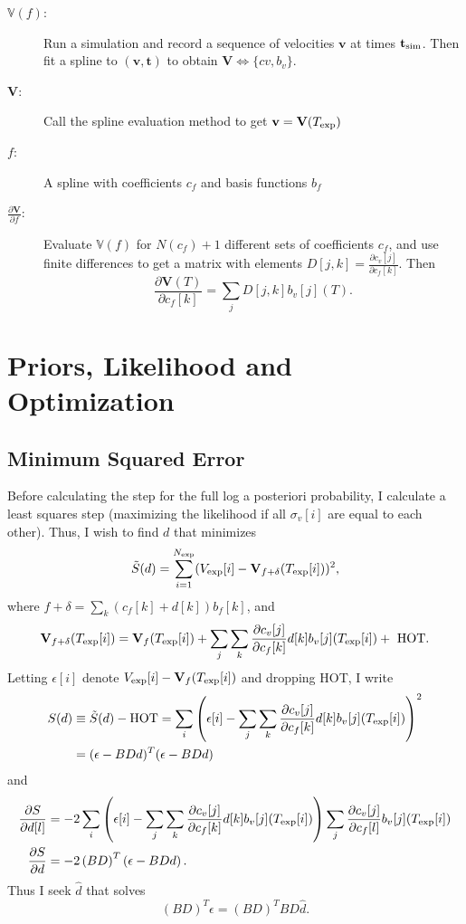 \documentclass[12pt]{article}
\newcommand{\partiald}[2]{\frac{\partial #1}{\partial #2}}
\newcommand\bv{\mathbf{v}}
\newcommand\bt{\mathbf{t}}
\newcommand\Vfunc{\mathbb{V}}
\newcommand\Vt{\mathbf{V}}
\newcommand\vexp{V_{\rm{exp}}}
\newcommand\texp{T_{\rm{exp}}}
\newcommand\cf{c_f}
\newcommand\cv{c_v}
\newcommand\fbasis{b_f}
\newcommand\vbasis{b_v}
\newcommand\tsim{{\mathbf t}_{\rm{sim}}}
\newcommand\DVDf{\partiald{\Vt}{f}}
\begin{document}
\begin{description}
\item[$\Vfunc(f)$:] Run a simulation and record a sequence of
  velocities $\bv$ at times $\tsim$.  Then fit a
  spline to $(\bv, \bt)$ to obtain $\Vt\iff \{cv,\vbasis\}$.
\item[$\Vt$:] Call the spline evaluation method to get $\bv = \Vt(\texp)$
\item[$f$:] A spline with coefficients $\cf$ and basis functions
  $\fbasis$
\item[$\DVDf$:] Evaluate $\Vfunc(f)$ for $N(\cf)+1$ different sets of
  coefficients $\cf$, and use finite differences to get a matrix with
  elements $D[j,k] = \partiald{\cv[j]}{\cf[k]}$.  Then
  \begin{equation*}
    \partiald{\Vt(T)}{\cf[k]} = \sum_j D[j,k] \vbasis[j](T).
  \end{equation*}
\end{description}

\section{Priors, Likelihood and Optimization}
\label{sec:opt}

\subsection{Minimum Squared Error}
\label{sec:minsq}

Before calculating the step for the full log a posteriori probability,
I calculate a least squares step (maximizing the likelihood if all
$\sigma_v[i]$ are equal to each other).  Thus, I wish to find $d$ that
minimizes
\begin{equation}
  \label{eq:ssq}
  \tilde S(d) = \sum_{i=1}^{N_{\rm exp}} (\vexp[i] - \Vt_{f+\delta}(\texp[i]))^2,
\end{equation}
where $f+\delta = \sum_k (\cf[k] + d[k])\fbasis[k]$, and 
\begin{equation}
  \label{eq:taylor}
  \Vt_{f+\delta}(\texp[i]) = \Vt_f(\texp[i]) +
  \sum_j \sum_k \partiald{\cv[j]}{\cf[k]}d[k]\vbasis[j](\texp[i])
  +\text{ HOT}.
\end{equation}
Letting $\epsilon[i]$ denote $\vexp[i] - \Vt_f(\texp[i])$ and dropping
HOT, I write
\begin{align*}
  S(d) &\equiv \tilde S(d) - \text{HOT} = \sum_i \left( \epsilon[i] -
  \sum_j \sum_k \partiald{\cv[j]}{\cf[k]}d[k]\vbasis[j](\texp[i])
  \right)^2\\
  &= (\epsilon - BDd)^T(\epsilon - BDd)
\end{align*}
and
\begin{align*}
  \partiald{S}{d[l]} &= -2 \sum_i \left( \epsilon[i] -
  \sum_j \sum_k \partiald{\cv[j]}{\cf[k]}d[k]\vbasis[j](\texp[i])
  \right)
  \sum_j \partiald{\cv[j]}{\cf[l]}\vbasis[j](\texp[i])\\
  \partiald{S}{d} &= -2\left(BD\right)^T\left(\epsilon - BDd\right).
\end{align*}
Thus I seek $\hat d$ that solves
\begin{equation}
  \label{eq:dhat}
  \left(BD\right)^T\epsilon = \left(BD\right)^T BD \hat d.
\end{equation}
\end{document}
